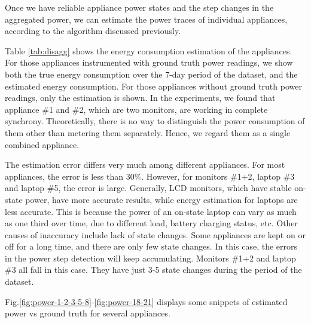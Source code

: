 Once we have reliable appliance power states and the step changes in the aggregated power, we can estimate the power traces of individual appliances, according to the algorithm discussed previously. 

Table \ref{tab:disagg} shows the energy consumption estimation of the appliances. For those appliances instrumented with ground truth power readings, we show both the true energy consumption over the 7-day period of the dataset, and the estimated energy consumption. For those appliances without ground truth power readings, only the estimation is shown. In the experiments, we found that appliance \#1 and \#2, which are two monitors, are working in complete synchrony. Theoretically, there is no way to distinguish the power consumption of them other than metering them separately. Hence, we regard them as a single combined appliance. 

The estimation error differs very much among different appliances. For most appliances, the error is less than 30\%. However, for monitors \#1+2, laptop \#3 and laptop \#5, the error is large. Generally, LCD monitors, which have stable on-state power, have more accurate results, while energy estimation for laptops are less accurate. This is because the power of an on-state laptop can vary as much as one third over time, due to different load, battery charging status, etc. Other causes of inaccuracy include lack of state changes. Some appliances are kept on or off for a long time, and there are only few state changes. In this case, the errors in the power step detection will keep accumulating. Monitors \#1+2 and laptop \#3 all fall in this case. They have just 3-5 state changes during the period of the dataset. 

Fig.\ref{fig:power-1-2-3-5-8}-\ref{fig:power-18-21} displays some snippets of estimated power vs ground truth for several appliances. 

